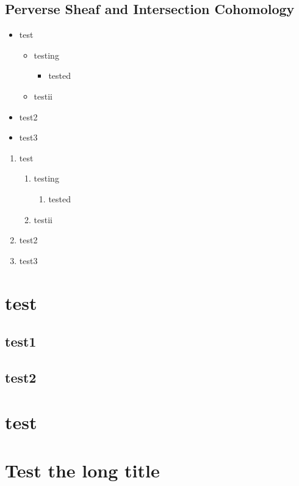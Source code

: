\documentclass[lang=en,12pt,twoside]{textbook}
\begin{document}
\section{Perverse Sheaf and Intersection Cohomology}

\begin{itemize}
    \item test
    \begin{itemize}
        \item testing
        \begin{itemize}
            \item tested
        \end{itemize}
        \item testii
    \end{itemize}
    \item test2
    \item test3
\end{itemize}

\begin{enumerate}
    \item test
    \begin{enumerate}
        \item testing
        \begin{enumerate}
            \item tested
        \end{enumerate}
        \item testii
    \end{enumerate}
    \item test2
    \item test3
\end{enumerate}

\chapter{test}
\section{test1}
\section{test2}
\chapter*{test}


\chapter*{Test the long title}
















%
\printbibliography[heading=bibintoc]
\end{document}
